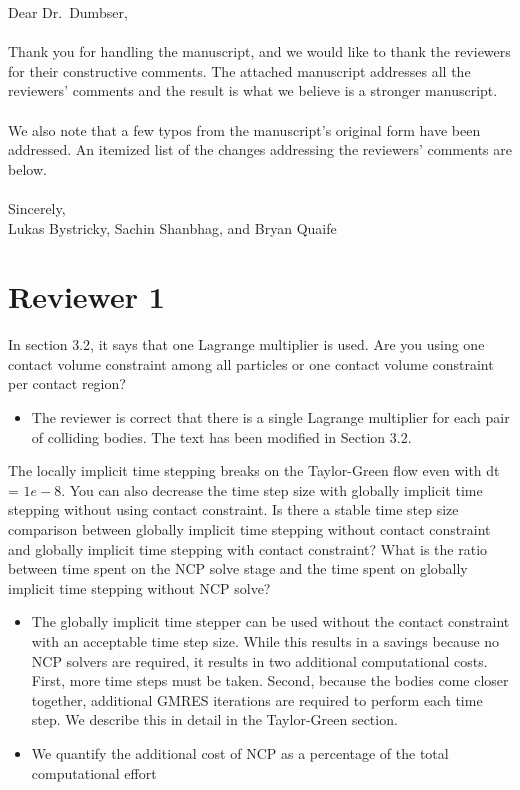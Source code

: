 \documentclass[11pt]{article}
\newcommand{\comment}[1]{{\color{blue} #1}}
\begin{document}
\noindent
Dear Dr.~Dumbser,
\\ \\ \noindent 
Thank you for handling the manuscript, and we would like to thank the
reviewers for their constructive comments. The attached manuscript
addresses all the reviewers’ comments and the result is what we believe
is a stronger manuscript.
\\ \\ \noindent 
We also note that a few typos from the manuscript’s original form have
been addressed. An itemized list of the changes addressing the
reviewers’ comments are below.
\\ \\ \noindent 
Sincerely, \\ \noindent
Lukas Bystricky, Sachin Shanbhag, and Bryan Quaife

\section*{Reviewer 1}
\noindent
\comment{In section 3.2, it says that one Lagrange multiplier is used.
Are you using one contact volume constraint among all particles or one
contact volume constraint per contact region?}
\begin{itemize}
  \item The reviewer is correct that there is a single Lagrange
    multiplier for each pair of colliding bodies.  The text has been
    modified in Section 3.2.
\end{itemize}

\noindent
\comment{The locally implicit time stepping breaks on the Taylor-Green
  flow even with dt = $1e-8$. You can also decrease the time step size
  with globally implicit time stepping without using contact constraint.
  Is there a stable time step size comparison between globally implicit
  time stepping without contact constraint and globally implicit time
  stepping with contact constraint? What is the ratio between time spent
  on the NCP solve stage and the time spent on globally implicit time
  stepping without NCP solve?}
\begin{itemize}
  \item The globally implicit time stepper can be used without the
    contact constraint with an acceptable time step size.  While this
    results in a savings because no NCP solvers are required, it results
    in two additional computational costs.  First, more time steps must
    be taken.  Second, because the bodies come closer together,
    additional GMRES iterations are required to perform each time step.
    We describe this in detail in the Taylor-Green section.

  \item We quantify the additional cost of NCP as a percentage of the
    total computational effort
\end{itemize}
\end{document}
